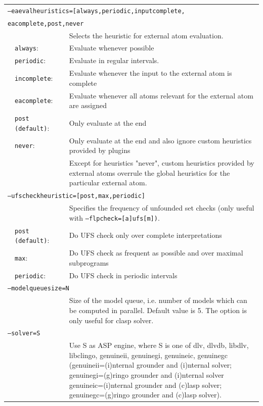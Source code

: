 \documentclass[a4paper, titlepage]{article}
\begin{document}
\begin{center}
\begin{longtable}{p{0.7cm}  p{2.2cm} p{0.3cm} p{6.3cm}  }
\multicolumn{4}{l}{\texttt{--eaevalheuristics=[always,periodic,inputcomplete,}}\\
\multicolumn{4}{l}{\texttt{eacomplete,post,never}}\\
& & & Selects the heuristic for external atom evaluation.\\
&\texttt{always}:&&Evaluate whenever possible\\
&\texttt{periodic}:&&Evaluate in regular intervals.\\
&\texttt{incomplete}:&&Evaluate whenever the input to the external atom is complete\\
&\texttt{eacomplete}:&& Evaluate whenever all atoms relevant for the external atom are assigned\\
&\texttt{post (default)}:&&Only evaluate at the end\\
&\texttt{never}:&&Only evaluate at the end and also ignore custom heuristics provided by plugins\\
&&&Except for heuristics "never", custom heuristics provided by external atoms overrule the global heuristics for the particular external atom.\\
\multicolumn{4}{l}{\texttt{--ufscheckheuristic=[post,max,periodic]}}\\
& & & Specifies the frequency of unfounded set checks (only useful with \texttt{--flpcheck=[a]ufs[m])}.\\
&\texttt{post (default)}:&&Do UFS check only over complete interpretations\\
&\texttt{max}:&&Do UFS check as frequent as possible and over maximal subprograms\\
&\texttt{periodic}:&&Do UFS check in periodic intervals\\
\multicolumn{4}{l}{\texttt{--modelqueuesize=N}}\\
& & & Size of the model queue, i.e. number of models which can be computed in parallel. Default value is 5. The option is only useful for clasp solver.\\
\multicolumn{4}{l}{\texttt{--solver=S}}\\
& & & Use S as ASP engine, where S is one of dlv, dlvdb, libdlv, libclingo, genuineii, genuinegi, genuineic, genuinegc (genuineii=(i)nternal grounder and (i)nternal solver; genuinegi=(g)ringo grounder and (i)nternal solver genuineic=(i)nternal grounder and (c)lasp solver; genuinegc=(g)ringo grounder and (c)lasp solver).\\

\end{longtable}
\end{center}
\end{document}
